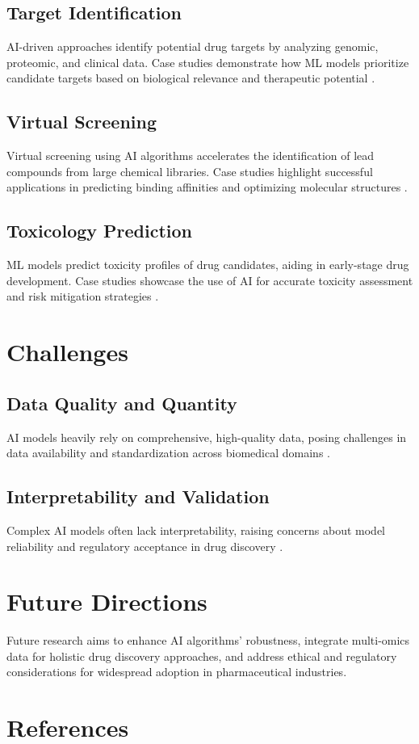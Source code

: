 \documentclass[12pt]{article}
\begin{document}
\subsection{Target Identification}
AI-driven approaches identify potential drug targets by analyzing genomic, proteomic, and clinical data. Case studies demonstrate how ML models prioritize candidate targets based on biological relevance and therapeutic potential \citep{aliper2016deep, xu2020ai}.

\subsection{Virtual Screening}
Virtual screening using AI algorithms accelerates the identification of lead compounds from large chemical libraries. Case studies highlight successful applications in predicting binding affinities and optimizing molecular structures \citep{gawehn2016deep, stokes2020molecular}.

\subsection{Toxicology Prediction}
ML models predict toxicity profiles of drug candidates, aiding in early-stage drug development. Case studies showcase the use of AI for accurate toxicity assessment and risk mitigation strategies \citep{chen2018machine, sheridan2020modeling}.

\section{Challenges}
\subsection{Data Quality and Quantity}
AI models heavily rely on comprehensive, high-quality data, posing challenges in data availability and standardization across biomedical domains \citep{chen2018big, cui2020challenges}.

\subsection{Interpretability and Validation}
Complex AI models often lack interpretability, raising concerns about model reliability and regulatory acceptance in drug discovery \citep{mccurdy2019interpretable, ching2018opportunities}.

\section{Future Directions}
Future research aims to enhance AI algorithms' robustness, integrate multi-omics data for holistic drug discovery approaches, and address ethical and regulatory considerations for widespread adoption in pharmaceutical industries.

\section*{References}


\end{document}
